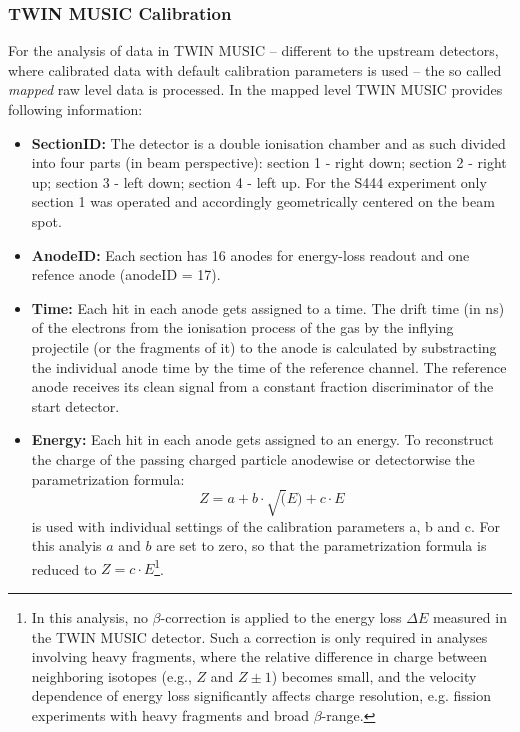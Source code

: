\subsubsection{TWIN MUSIC Calibration}
For the analysis of data in TWIN MUSIC -- different to the upstream detectors, where calibrated data with default calibration parameters is used -- the so called \textit{mapped} raw level data is processed. In the mapped level TWIN MUSIC provides following information:
\begin{itemize}
\itemsep0em 
\item \textbf{SectionID:} The detector is a double ionisation chamber and as such divided into four parts (in beam perspective): section 1 - right down; section 2 - right up; section 3 - left down; section 4 - left up. For the S444 experiment only section 1 was operated and accordingly geometrically centered on the beam spot.
\item \textbf{AnodeID:} Each section has 16 anodes for energy-loss readout and one refence anode (anodeID = 17).
\item \textbf{Time:} Each hit in each anode gets assigned to a time. The drift time (in ns) of the electrons from the ionisation process of the gas by the inflying projectile (or the fragments of it) to the anode is calculated by substracting the individual anode time by the time of the reference channel. The reference anode receives its clean signal from a constant fraction discriminator of the start detector.
\item \textbf{Energy:} Each hit in each anode gets assigned to an energy. To reconstruct the charge of the passing charged particle anodewise or detectorwise the parametrization formula: 
\begin{equation}\label{eq:param_z}
Z = a + b \cdot \sqrt(E) + c \cdot E
\end{equation}
is used with individual settings of the calibration parameters a, b and c. For this analyis $a$ and $b$ are set to zero, so that the parametrization formula is reduced to $ Z = c \cdot E $\footnote{In this analysis, no \(\beta\)-correction is applied to the energy loss \(\Delta E\) measured in the TWIN MUSIC detector. Such a correction is only required in analyses involving heavy fragments, where the relative difference in charge between neighboring isotopes (e.g., \(Z\) and \(Z \pm 1\)) becomes small, and the velocity dependence of energy loss significantly affects charge resolution, e.g. fission experiments with heavy fragments and broad \(\beta\)-range.}. 
\end{itemize}

